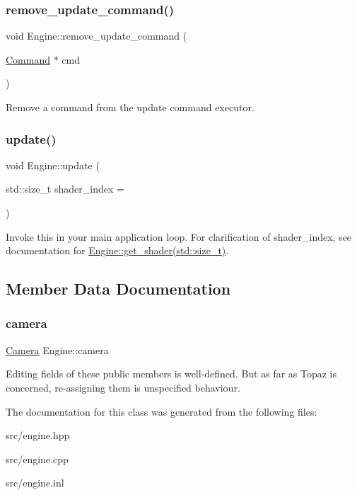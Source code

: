 \subsubsection{\texorpdfstring{remove\+\_\+update\+\_\+command()}{remove\_update\_command()}}
{\footnotesize\ttfamily void Engine\+::remove\+\_\+update\+\_\+command (\begin{DoxyParamCaption}\item[{\mbox{\hyperlink{class_command}{Command}} $\ast$}]{cmd }\end{DoxyParamCaption})}

Remove a command from the update command executor. \mbox{\label{class_engine_a12375001d456a8beb1b51c5f97ad6c22}} 
\subsubsection{\texorpdfstring{update()}{update()}}
{\footnotesize\ttfamily void Engine\+::update (\begin{DoxyParamCaption}\item[{std\+::size\+\_\+t}]{shader\+\_\+index = {} }\end{DoxyParamCaption})}

Invoke this in your main application loop. For clarification of \textquotesingle{}shader\+\_\+index\textquotesingle{}, see documentation for \mbox{\hyperlink{class_engine_af92650e3ce3cabf7e527c92ae4917702}{Engine\+::get\+\_\+shader(std\+::size\+\_\+t)}}. 

\subsection{Member Data Documentation}
\mbox{\label{class_engine_a25924c4045f695c4fb6b6439777b1920}} 
\subsubsection{\texorpdfstring{camera}{camera}}
{\footnotesize\ttfamily \mbox{\hyperlink{class_camera}{Camera}} Engine\+::camera}

Editing fields of these public members is well-\/defined. But as far as Topaz is concerned, re-\/assigning them is unspecified behaviour. 

The documentation for this class was generated from the following files\+:\begin{DoxyCompactItemize}
\item 
src/engine.\+hpp\item 
src/engine.\+cpp\item 
src/engine.\+inl\end{DoxyCompactItemize}
